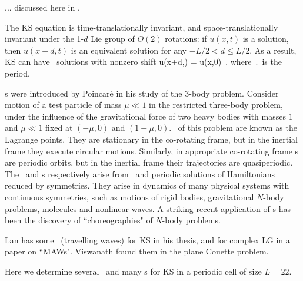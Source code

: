 \renewcommand{\inputfile}{\version\ - edited 2007-03-11 rpoHistory}


... discussed here in .

The KS equation   is time-translationally invariant,
and
space-translationally invariant
under the 1-$d$ Lie group of $O(2)$ rotations: if
$u(x,t)$ is a solution, then $u(x+d,t)$ is an equivalent
solution for any $-L/2 < d \leq L/2$.
As a result,
KS can have \rpo\ solutions with nonzero shift
\beq
u(x+d,\period{}) = u(x,0)
\,.
where $\period{}$ is the period.


{\Rpo s} were introduced by Poincar\'e in his study of
the 3-body problem.
Consider motion of a test particle of mass
$\mu \ll 1$ in the
restricted three-body problem,
under the
influence of the gravitational force of two heavy bodies with masses $1$ and
$\mu \ll 1$ fixed at $(-\mu,0)$ and $(1-\mu,0)$. \Reqva\ of this problem
are known as the Lagrange points. They are stationary in
the co-rotating frame, but
in the inertial frame they execute circular motions.
Similarly, in appropriate co-rotating frame
{\rpo s} are periodic orbits,
but in the inertial frame their trajectories
are quasiperiodic.
The \reqva\ and \rpo s
respectively arise from
\eqva\ and periodic solutions of Hamiltonians reduced by symmetries.
They arise in dynamics of many physical systems
with continuous symmetries, such as motions of rigid bodies, gravitational
$N$-body problems, molecules and nonlinear waves.
A striking recent application of \rpo s has been the discovery
of ``choreographies" of $N$-body problems.

Lan has some \reqva\ (travelling waves) for KS in his
thesis, %
 and for complex LG in a paper on ``MAWs".
Viswanath %
found them in the plane Couette problem.

Here we determine
several \eqva\ and many \rpo s for
KS in a periodic cell of size $L=22$.
